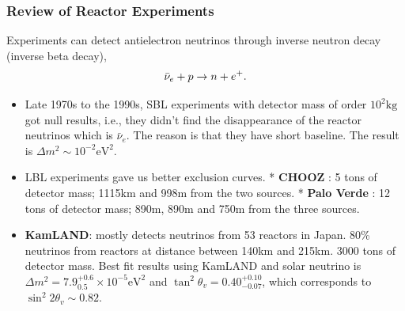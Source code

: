 \documentclass[letterpaper,12pt,english]{sphinxmanual}
\begin{document}
\subsubsection{Review of Reactor Experiments}
\label{experiments:review-of-reactor-experiments}
Experiments can detect antielectron neutrinos through inverse neutron decay (inverse beta decay),
\begin{gather}
\begin{split}\bar\nu_e + p \to n + e^+ .\end{split}\notag
\end{gather}\begin{itemize}
\item {} 
Late 1970s to the 1990s, SBL experiments with detector mass of order \(10^2\mathrm{kg}\) got null results, i.e., they didn't find the disappearance of the reactor neutrinos which is \(\bar\nu_e\). The reason is that they have short baseline. The result is \(\Delta m^2\sim 10^{-2}\mathrm{eV^2}\).

\item {} 
LBL experiments gave us better exclusion curves.
* \textbf{CHOOZ} : 5 tons of detector mass; 1115km and 998m from the two sources.
* \textbf{Palo Verde} : 12 tons of detector mass; 890m, 890m and 750m from the three sources.

\item {} 
\textbf{KamLAND}: mostly detects neutrinos from 53 reactors in Japan. 80\% neutrinos from reactors at distance between 140km and 215km.  3000 tons of detector mass. Best fit results using KamLAND and solar neutrino is \(\Delta m^2 = 7.9^{+0.6}_{0.5}\times 10^{-5}\mathrm{eV^2}\) and \(\tan^2\theta_v = 0.40^{+0.10}_{-0.07}\), which corresponds to \(\sin^2 2\theta_v \sim 0.82\).

\end{itemize}
\end{document}
